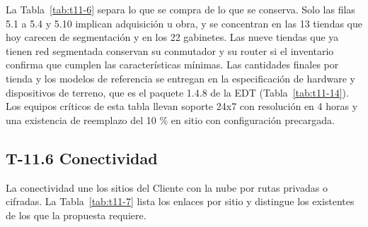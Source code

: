 \documentclass[11pt]{article}
\begin{document}
La Tabla~\mbox{\ref{tab:t11-6}} separa lo que se compra de lo que se conserva. Solo las filas 5.1 a 5.4 y 5.10 implican adquisición u obra, y se concentran en las 13 tiendas que hoy carecen de segmentación y en los 22 gabinetes. Las nueve tiendas que ya tienen red segmentada conservan su conmutador y su router si el inventario confirma que cumplen las características mínimas. Las cantidades finales por tienda y los modelos de referencia se entregan en la especificación de hardware y dispositivos de terreno, que es el paquete 1.4.8 de la EDT (Tabla~\mbox{\ref{tab:t11-14}}). Los equipos críticos de esta tabla llevan soporte 24x7 con resolución en 4 horas y una existencia de reemplazo del 10 \% en sitio con configuración precargada.

\subsection{T-11.6 Conectividad}\label{t-11-6}

La conectividad une los sitios del Cliente con la nube por rutas privadas o cifradas. La Tabla~\mbox{\ref{tab:t11-7}} lista los enlaces por sitio y distingue los existentes de los que la propuesta requiere.
\end{document}
